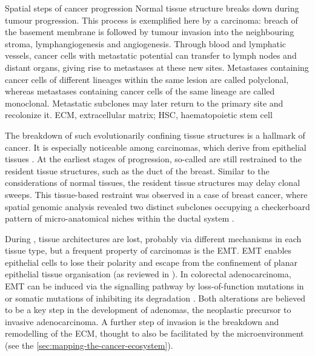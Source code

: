     {Spatial steps of cancer progression \parencite{Seferbekova2023-wg}}
    {Normal tissue structure breaks down during tumour progression. This process is exemplified here by a carcinoma: breach of the basement membrane is followed by tumour invasion into the neighbouring stroma, lymphangiogenesis and angiogenesis. Through blood and lymphatic vessels, cancer cells with metastatic potential can transfer to lymph nodes and distant organs, giving rise to metastases at these new sites. Metastases containing cancer cells of different lineages within the same lesion are called polyclonal, whereas metastases containing cancer cells of the same lineage are called monoclonal. Metastatic subclones may later return to the primary site and recolonize it. ECM, extracellular matrix; HSC, haematopoietic stem cell}

The breakdown of such evolutionarily confining tissue structures is a hallmark of cancer. It is especially noticeable among carcinomas, which derive from epithelial tissues . At the earliest stages of progression, so-called  are still restrained to the resident tissue structures, such as the duct of the breast. Similar to the considerations of normal tissues, the resident tissue structures may delay clonal sweeps. This tissue-based restraint was observed in a case of breast cancer, where spatial genomic analysis revealed two distinct subclones occupying a checkerboard pattern of micro-anatomical niches within the ductal system \parencite{Lomakin2022-ks}.

During , tissue architectures are lost, probably via different mechanisms in each tissue type, but a frequent property of carcinomas is the \ac{EMT}. \ac{EMT} enables epithelial cells to lose their polarity and escape from the confinement of planar epithelial tissue organisation (as reviewed in \textcite{Polyak2009-fi}). In colorectal adenocarcinoma, \ac{EMT} can be induced via the  signalling pathway by loss-of-function mutations in  or somatic mutations of  inhibiting its degradation \parencite{Morin1997-ez}. Both alterations are believed to be a key step in the development of adenomas, the neoplastic precursor to invasive adenocarcinoma. A further step of invasion is the breakdown and remodelling of the \ac{ECM}, thought to also be facilitated by the microenvironment (see the \cref{sec:mapping-the-cancer-ecosystem}).

